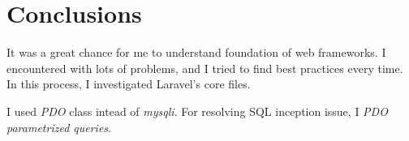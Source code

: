 \documentclass[12pt,a4paper]{article}
\begin{document}
\section{Conclusions}
    It was a great chance for me to understand foundation of web frameworks. I encountered with lots of problems, and I tried to find best practices every time. In this process, I investigated Laravel's core files.

    I used \emph{PDO} class intead of \emph{mysqli}. For resolving SQL inception issue, I \emph{PDO parametrized queries}.
\end{document}
